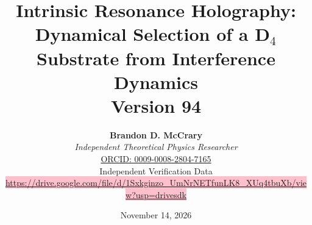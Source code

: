 \documentclass[a4paper,11pt]{article}
\begin{document}
\title{\textbf{\Huge Intrinsic Resonance Holography:}\\[0.8em]
\Large Dynamical Selection of a D$_4$ Substrate from Interference Dynamics\\[0.5em]
\large Version 94}
\vspace{1.5cm}
\author{\textbf{Brandon D. McCrary}\\[0.25em]
\textit{Independent Theoretical Physics Researcher}\\[0.5em]
\href{https://orcid.org/0009-0008-2804-7165}{ORCID: 0009-0008-2804-7165}\\[0.5em]
Independent Verification Data\\[0.25em]
{\small\colorbox{pink}{\href{https://drive.google.com/file/d/1Sxkginzo_UmNrNETfunLK8_XUq4tbuXb/view?usp=drivesdk}{https://drive.google.com/file/d/1Sxkginzo\_UmNrNETfunLK8\_XUq4tbuXb/view?usp=drivesdk}}}}

\date{November 14, 2026}

\maketitle
\end{document}
